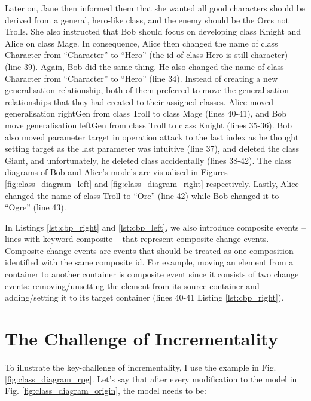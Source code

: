 Later on, Jane then informed them that she wanted all good characters should be derived from a general, hero-like class, and the enemy should be the Orcs not Trolls. She also instructed that Bob should focus on developing class \textsf{Knight} and Alice on class \textsf{Mage}. In consequence, Alice then changed the name of class \textsf{Character} from ``Character'' to ``Hero'' (the id of class \textsf{Hero} is still \textsf{character}) (line 39). Again, Bob did the same thing. He also changed the name of class \textsf{Character} from ``Character'' to ``Hero'' (line 34). Instead of creating a new generalisation relationship, both of them preferred to move the generalisation relationships that they had created to their assigned classes. Alice moved generalisation \textsf{rightGen} from class \textsf{Troll} to class \textsf{Mage} (lines 40-41), and Bob move generalisation \textsf{leftGen} from class \textsf{Troll} to class \textsf{Knight} (lines 35-36). Bob also moved parameter \textsf{target} in operation \textsf{attack} to the last index as he thought setting target as the last parameter was intuitive (line 37), and deleted the class {Giant}, and unfortunately, he deleted class  accidentally (lines 38-42). The class diagrams of Bob and Alice's models are visualised in Figures \ref{fig:class_diagram_left} and \ref{fig:class_diagram_right} respectively. Lastly, Alice changed the \textsf{name} of class \textsf{Troll} to ``Orc'' (line 42) while Bob changed it to ``Ogre'' (line 43).  

In Listings \ref{lst:cbp_right} and \ref{lst:cbp_left}, we also introduce composite events -- lines with keyword \textsf{composite} -- that represent composite change events. 
Composite change events are events that should be treated as one composition -- identified with the same composite id. 
For example, moving an element from a container to another container is composite event since it consists of two change events: 
removing/unsetting the element from its source container and adding/setting it to its target container (lines 40-41 Listing \ref{lst:cbp_right}). 

\section{The Challenge of Incrementality}
\label{sec:the_key_challenge_of_incrementality}
To illustrate the key-challenge of incrementality, I use the example in Fig. \ref{fig:class_diagram_rpg}. Let's say that after every modification to the model in Fig. \ref{fig:class_diagram_origin}, the model needs to be:


